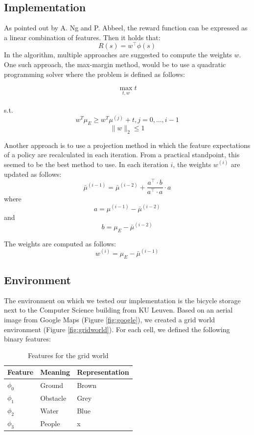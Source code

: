 \documentclass[10pt,a4paper,twocolumn]{article}
\begin{document}
\subsection{Implementation}
As pointed out by A. Ng and P. Abbeel, the reward function can be expressed as a linear combination of features. Then it holds that:
$$R(s) = w^\intercal\phi(s)$$
In the algorithm, multiple approaches are suggested to compute the weights $w$. One such approach, the max-margin method, would be to use a quadratic programming solver where the problem is defined as follows:

$$\max\limits_{t, w} t$$\\
s.t. $$w^T \mu_E \geq w^T \mu^{(j)} + t, j= 0,...,i-1$$
$$\|w\|_2 \leq 1$$

Another approach is to use a projection method in which the feature expectations of a policy are recalculated in each iteration. From a practical standpoint, this seemed to be the best method to use. In each iteration $i$, the weights $w^{(i)}$ are updated as follows:\\
$$\bar{\mu}^{(i-1)} = \bar{\mu}^{(i-2)} + \frac
	{a^\intercal\cdot b}
	{a^\intercal\cdot a}
	\cdot
	a$$
where 
$$a = \mu^{(i-1)}-\bar{\mu}^{(i-2)}$$
and
$$b = \mu_E - \bar{\mu}^{(i-2)}$$

The weights are computed as follows:
$$w^{(i)} = \mu_E - \bar{\mu}^{(i-1)}$$


\subsection{Environment}
The environment on which we tested our implementation is the bicycle storage next to the Computer Science building from KU Leuven. Based on an aerial image from Google Maps (Figure \ref{fig:google}), we created a grid world environment (Figure \ref{fig:gridworld}). For each cell, we defined the following binary features:

\begin{table}[h]
\centering
\begin{tabular}{|l|l|l|}
	\hline
	Feature		&	Meaning		&	Representation\\\hline
	$\phi_0$		&	Ground		&	Brown\\
	$\phi_1$		&	Obstacle		&	Grey\\
	$\phi_2$		&	Water		&	Blue\\
	$\phi_3$		&	People		&	x\\
	\hline
\end{tabular}
\caption{Features for the grid world}
\end{table}
\end{document}
